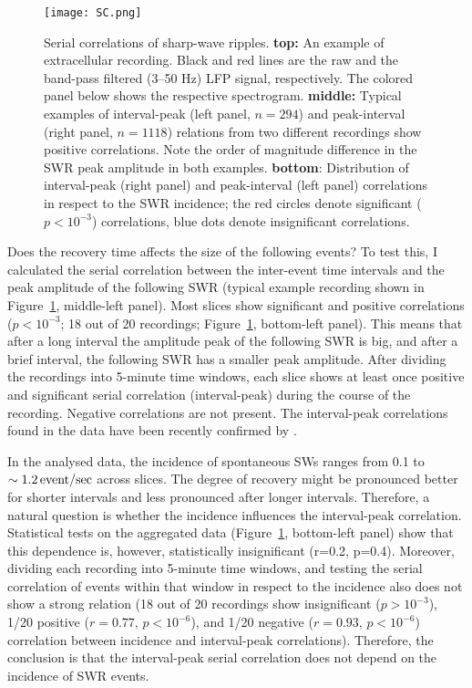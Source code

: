     \begin{figure}
      \centering
      \texttt{[image: SC.png]}
      \caption{Serial correlations of sharp-wave ripples.
        \textbf{top:} An example of extracellular recording. Black and red lines
        are the raw and the band-pass filtered (3--50 Hz) LFP signal,
        respectively. The colored panel below shows the respective spectrogram.
        \textbf{middle:} Typical examples of interval-peak (left panel, $n=294$) and peak-interval
        (right panel, $n=1118$) relations from two different recordings show positive
        correlations. Note the order of magnitude difference in the SWR peak
        amplitude in both examples.
        \textbf{bottom}: Distribution of interval-peak (right panel) and
        peak-interval (left panel) correlations in respect to the SWR
        incidence; the red circles denote significant ($p<10^{-3}$)
        correlations, blue dots denote insignificant correlations.
             }
      \label{fig:sc}
    \end{figure}
  
    Does the recovery time affects the size of the following events? To test
    this, I calculated the serial correlation between the inter-event time
    intervals and the peak amplitude of the following SWR (typical example
    recording shown in Figure~\ref{fig:sc}, middle-left panel). Most slices
    show significant and positive correlations ($p<10^{-3}$; 18 out of 20
    recordings; Figure~\ref{fig:sc}, bottom-left panel). This means that after
    a long interval the amplitude peak of the following SWR is big, and after a
    brief interval, the following SWR has a smaller peak amplitude. After
    dividing the recordings into 5-minute time windows, each slice shows at
    least once positive and significant serial correlation (interval-peak)
    during the course of the recording. Negative correlations are not present.
    The interval-peak correlations found in the data have been recently
    confirmed by \cite{Kohus2016}.

    In the analysed data, the incidence of spontaneous SWs ranges from 0.1 to
    $\sim 1.2 \,\rm event/sec$ across slices. The degree of recovery might be
    pronounced better for shorter intervals and less pronounced after longer
    intervals. Therefore, a natural question is whether the incidence
    influences the interval-peak correlation. Statistical tests on the
    aggregated data (Figure~\ref{fig:sc}, bottom-left panel) show that this
    dependence is, however, statistically insignificant (r=0.2, p=0.4). Moreover,
    dividing each recording into 5-minute time windows, and testing the serial
    correlation of events within that window in respect to the incidence also
    does not show a strong relation (18 out of 20 recordings show insignificant
    ($p>10^{-3}$), 1/20 positive ($r=0.77 ,\, p<10^{-6}$), and 1/20 negative
    ($r=0.93,\,p<10^{-6}$) correlation between incidence and interval-peak
    correlations). Therefore, the conclusion is that the interval-peak serial
    correlation does not depend on the incidence of SWR events.


